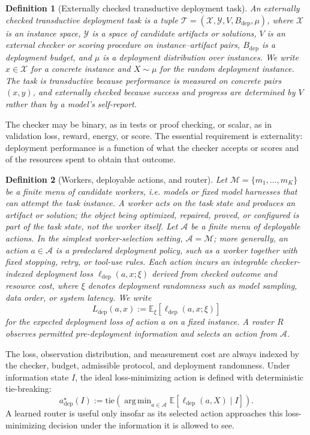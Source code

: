 \documentclass{article}
\newtheorem{definition}{Definition}
\DeclareMathOperator*{\argmin}{arg\,min}
\newcommand{\cA}{\mathcal{A}}
\newcommand{\cM}{\mathcal{M}}
\newcommand{\cT}{\mathcal{T}}
\newcommand{\cX}{\mathcal{X}}
\newcommand{\cY}{\mathcal{Y}}
\newcommand{\E}{\mathbb{E}}
\begin{document}
\begin{definition}[Externally checked transductive deployment task]
An externally checked transductive deployment task is a tuple
$\cT=(\cX,\cY,V,B_{\mathrm{dep}},\mu)$,
where $\cX$ is an instance space, $\cY$ is a space of candidate artifacts or solutions, $V$ is an external checker or scoring procedure on instance--artifact pairs, $B_{\mathrm{dep}}$ is a deployment budget, and $\mu$ is a deployment distribution over instances.
We write $x\in\cX$ for a concrete instance and $X\sim\mu$ for the random deployment instance.
The task is transductive because performance is measured on concrete pairs $(x,y)$, and externally checked because success and progress are determined by $V$ rather than by a model's self-report.
\end{definition}

The checker may be binary, as in tests or proof checking, or scalar, as in validation loss, reward, energy, or score.
The essential requirement is externality: deployment performance is a function of what the checker accepts or scores and of the resources spent to obtain that outcome.

\begin{definition}[Workers, deployable actions, and router]
Let $\cM=\{m_1,\ldots,m_K\}$ be a finite menu of candidate workers, i.e. models or fixed model harnesses that can attempt the task instance.
A worker acts on the task state and produces an artifact or solution; the object being optimized, repaired, proved, or configured is part of the task state, not the worker itself.
Let $\cA$ be a finite menu of deployable actions.
In the simplest worker-selection setting, $\cA=\cM$; more generally, an action $a\in\cA$ is a predeclared deployment policy, such as a worker together with fixed stopping, retry, or tool-use rules.
Each action incurs an integrable checker-indexed deployment loss $\ell_{\mathrm{dep}}(a,x;\xi)$ derived from checked outcome and resource cost, where $\xi$ denotes deployment randomness such as model sampling, data order, or system latency.
We write
\[
L_{\mathrm{dep}}(a,x):=\E_\xi[\ell_{\mathrm{dep}}(a,x;\xi)]
\]
for the expected deployment loss of action $a$ on a fixed instance.
A router $R$ observes permitted pre-deployment information and selects an action from $\cA$.
\end{definition}

The loss, observation distribution, and measurement cost are always indexed by the checker, budget, admissible protocol, and deployment randomness.
Under information state $I$, the ideal loss-minimizing action is defined with deterministic tie-breaking:
\[
a^\star_{\mathrm{dep}}(I):=
\mathrm{tie}\!\left(
\argmin_{a\in\cA}\E[\ell_{\mathrm{dep}}(a,X)\mid I]
\right).
\]
A learned router is useful only insofar as its selected action approaches this loss-minimizing decision under the information it is allowed to see.
\end{document}

